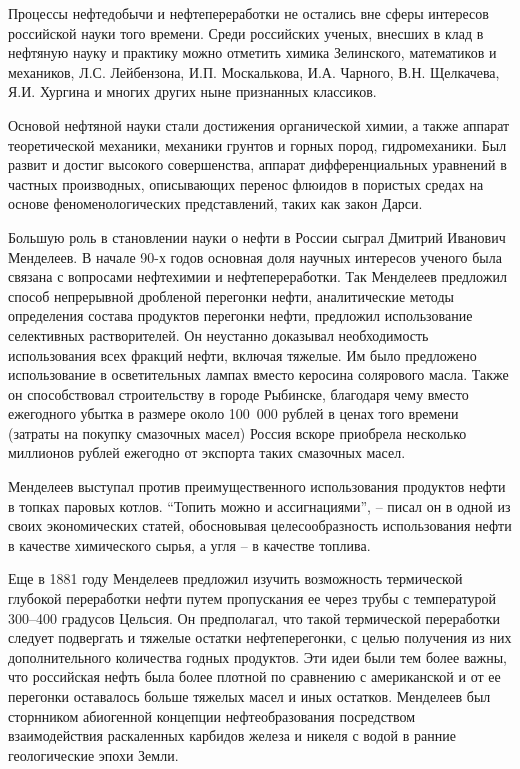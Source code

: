 Процессы нефтедобычи и нефтепереработки не остались вне сферы интересов российской науки того времени.
Среди российских ученых, внесших в клад в нефтяную науку и практику можно отметить химика Зелинского, математиков и механиков, Л.С.
Лейбензона, И.П.
Москалькова, И.А.
Чарного, В.Н.
Щелкачева, Я.И.
Хургина и многих других ныне признанных классиков.

Основой нефтяной науки стали достижения органической химии, а также аппарат теоретической механики, механики грунтов и горных пород, гидромеханики.
Был развит и достиг высокого совершенства, аппарат дифференциальных уравнений в частных производных, описывающих перенос флюидов в пористых средах на основе феноменологических представлений, таких как закон Дарси.

Большую роль в становлении науки о нефти в России сыграл Дмитрий Иванович Менделеев.
В начале 90-х годов основная доля научных интересов ученого была связана с вопросами нефтехимии и нефтепереработки.
Так Менделеев предложил способ непрерывной дробленой перегонки нефти, аналитические методы определения состава продуктов перегонки нефти, предложил использование селективных растворителей.
Он неустанно доказывал необходимость использования всех фракций нефти, включая тяжелые.
Им было предложено использование в осветительных лампах вместо керосина солярового масла.
Также он способствовал строительству в городе Рыбинске, благодаря чему вместо ежегодного убытка в размере около 100~000 рублей в ценах того времени (затраты на покупку смазочных масел) Россия вскоре приобрела несколько миллионов рублей ежегодно от экспорта таких смазочных масел.

Менделеев выступал против преимущественного использования продуктов нефти в топках паровых котлов.
``Топить можно и ассигнациями'', -- писал он в одной из своих экономических статей, обосновывая целесообразность использования нефти в качестве химического сырья, а угля -- в качестве топлива.

Еще в 1881 году Менделеев предложил изучить возможность термической глубокой переработки нефти путем пропускания ее через трубы с температурой 300--400 градусов Цельсия.
Он предполагал, что такой термической переработки следует подвергать и тяжелые остатки нефтеперегонки, с целью получения из них дополнительного количества годных продуктов.
Эти идеи были тем более важны, что российская нефть была более плотной по сравнению с американской и от ее перегонки оставалось больше тяжелых масел и иных остатков.
Менделеев был сторнником абиогенной концепции нефтеобразования посредством взаимодействия раскаленных карбидов железа и никеля с водой в ранние геологические эпохи Земли.

